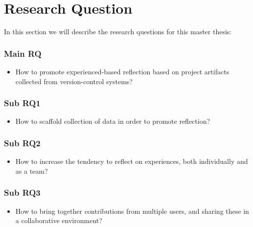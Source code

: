 \section{Research Question}
In this section we will describe the research questions for this master thesis:
\subsubsection{Main RQ}
\begin{itemize}
	\item How to promote experienced-based reflection based on project artifacts collected from version-control systems?
\end{itemize}
\subsubsection{Sub RQ1}
\begin{itemize}
	\item How to scaffold collection of data in order to promote reflection?
\end{itemize}

\subsubsection{Sub RQ2}
\begin{itemize}
	\item How to increase the tendency to reflect on experiences, both individually and as a team? 
\end{itemize}

\subsubsection{Sub RQ3}
\begin{itemize}
	\item How to bring together contributions from multiple users, and sharing these in a collaborative environment?
\end{itemize}

